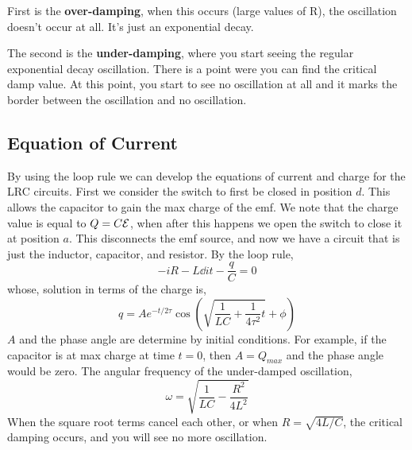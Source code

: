 First is the \textbf{over-damping}, when this occurs (large values of R), the oscillation doesn't occur at all. It's just an exponential decay. 

The second is the \textbf{under-damping}, where you start seeing the regular exponential decay oscillation. 
There is a point were you can find the critical damp value. At this point, you start to see no oscillation at all and it marks the border between the oscillation and no oscillation.

\subsection{Equation of Current}
By using the loop rule we can develop the equations of current and charge for the LRC circuits. 
First we consider the switch to first be closed in position $d$. This allows the capacitor to gain the max charge of the emf. We note that the charge value is equal to $Q=C\mathcal{E}$, when after this happens we open the switch to close it at position $a$. This disconnects the emf source, and now we have a circuit that is just the inductor, capacitor, and resistor. 
By the loop rule, 
\begin{equation*}
	-iR - L\dd{i}{t} - \frac{q}{C} = 0 
\end{equation*}
whose, solution in terms of the charge is, 
\begin{equation*}
	q = Ae^{-t/2\tau}\cos(\sqrt{\frac{1}{LC}+\frac{1}{4\tau^2}t} + \phi)
\end{equation*}
$A$ and the phase angle are determine by initial conditions. For example, if the capacitor is at max charge at time $t=0$, then $A=Q_{max}$ and the phase angle would be zero.
The angular frequency of the under-damped oscillation, 
\begin{equation*}
	\omega = \sqrt{\frac{1}{LC} - \frac{R^2}{4L^2}}
\end{equation*}
When the square root terms cancel each other, or when $R=\sqrt{4L/C}$, the critical damping occurs, and you will see no more oscillation. 